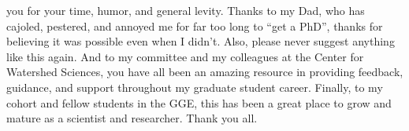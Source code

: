 \documentclass[twoside,12pt,final]{ucthesis-CA2012} %
\begin{document}
\begin{ucfrontmatter}
\begin{acknowledgements}
    you for your time, humor, and general levity. Thanks to my Dad, who has
    cajoled, pestered, and annoyed me for far too long to ``get a PhD'',
    thanks for believing it was possible even when I didn't. Also, please
    never suggest anything like this again. And to my committee and my
    colleagues at the Center for Watershed Sciences, you have all been an
    amazing resource in providing feedback, guidance, and support throughout
    my graduate student career. Finally, to my cohort and fellow students in
    the GGE, this has been a great place to grow and mature as a scientist
    and researcher. Thank you all.
  \end{acknowledgements}

  \begin{abstract}


\end{abstract}
\end{ucfrontmatter}
\end{document}
